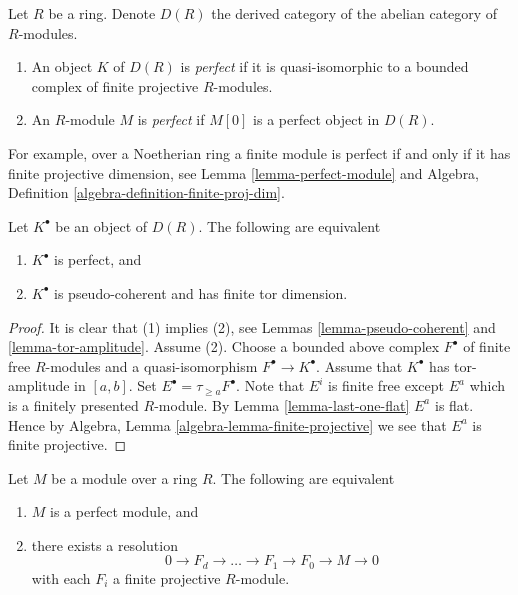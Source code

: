 \begin{definition}
\label{definition-perfect}
Let $R$ be a ring. Denote $D(R)$ the derived category of the abelian
category of $R$-modules.
\begin{enumerate}
\item An object $K$ of $D(R)$ is {\it perfect} if it is quasi-isomorphic
to a bounded complex of finite projective $R$-modules.
\item An $R$-module $M$ is {\it perfect} if $M[0]$ is a perfect object
in $D(R)$.
\end{enumerate}
\end{definition}

\noindent
For example, over a Noetherian ring a finite module is perfect if and
only if it has finite projective dimension, see
Lemma \ref{lemma-perfect-module}
and Algebra, Definition \ref{algebra-definition-finite-proj-dim}.

\begin{lemma}
\label{lemma-perfect}
Let $K^\bullet$ be an object of $D(R)$. The following are equivalent
\begin{enumerate}
\item $K^\bullet$ is perfect, and
\item $K^\bullet$ is pseudo-coherent and has finite tor dimension.
\end{enumerate}
\end{lemma}

\begin{proof}
It is clear that (1) implies (2), see
Lemmas \ref{lemma-pseudo-coherent} and \ref{lemma-tor-amplitude}.
Assume (2). Choose a bounded above complex $F^\bullet$
of finite free $R$-modules and a quasi-isomorphism $F^\bullet \to K^\bullet$.
Assume that $K^\bullet$ has tor-amplitude in $[a, b]$.
Set $E^\bullet = \tau_{\geq a}F^\bullet$. Note that $E^i$ is finite free
except $E^a$ which is a finitely presented $R$-module.
By
Lemma \ref{lemma-last-one-flat}
$E^a$ is flat. Hence by
Algebra, Lemma \ref{algebra-lemma-finite-projective}
we see that $E^a$ is finite projective.
\end{proof}

\begin{lemma}
\label{lemma-perfect-module}
Let $M$ be a module over a ring $R$. The following are equivalent
\begin{enumerate}
\item $M$ is a perfect module, and
\item there exists a resolution
$$
0 \to F_d \to \ldots \to F_1 \to F_0 \to M \to 0
$$
with each $F_i$ a finite projective $R$-module.
\end{enumerate}
\end{lemma}


